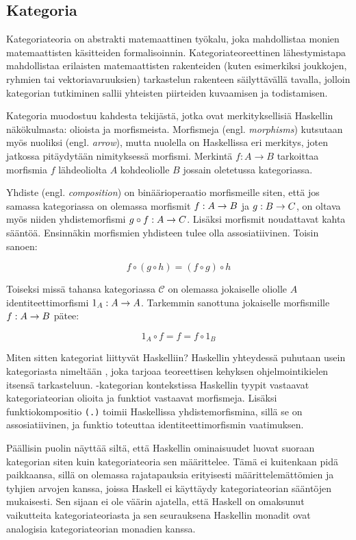 \documentclass[finnish]{tktltiki2}
\begin{document}
\subsection{Kategoria}

Kategoriateoria on abstrakti matemaattinen työkalu, joka mahdollistaa monien matemaattisten
käsitteiden formalisoinnin. Kategoriateoreettinen lähestymistapa mahdollistaa erilaisten
matemaattisten rakenteiden (kuten esimerkiksi joukkojen, ryhmien tai vektoriavaruuksien) tarkastelun
rakenteen säilyttävällä tavalla, jolloin kategorian tutkiminen sallii yhteisten piirteiden
kuvaamisen ja todistamisen.

Kategoria muodostuu kahdesta tekijästä, jotka ovat merkityksellisiä Haskellin näkökulmasta: olioista
ja morfismeista. Morfismeja (engl. \emph{morphisms}) kutsutaan myös nuoliksi (engl. \emph{arrow}),
mutta nuolella on Haskellissa eri merkitys, joten jatkossa pitäydytään nimityksessä morfismi.
Merkintä $f : A \rightarrow B$ tarkoittaa morfismia $f$ lähdeoliolta $A$ kohdeoliolle $B$ jossain
oletetussa kategoriassa.

Yhdiste (engl. \emph{composition}) on binäärioperaatio morfismeille siten, että jos samassa
kategoriassa on olemassa morfismit $f : A \rightarrow B$ ja $g : B \rightarrow C$, on oltava myös niiden
yhdistemorfismi $g \circ f : A \rightarrow C$. Lisäksi morfismit noudattavat kahta sääntöä. Ensinnäkin
morfismien yhdisteen tulee olla assosiatiivinen. Toisin sanoen:

$$f \circ (g \circ h) = (f \circ g) \circ h$$

Toiseksi missä tahansa kategoriassa $\mathcal{C}$ on olemassa jokaiselle oliolle $A$
identiteettimorfismi $1_A : A \rightarrow A$. Tarkemmin sanottuna jokaiselle morfismille $f : A \rightarrow B$
pätee:

$$ 1_A \circ f = f = f \circ 1_B $$


Miten sitten kategoriat liittyvät Haskelliin? Haskellin yhteydessä puhutaan usein kategoriasta
nimeltään , joka tarjoaa teoreettisen kehyksen ohjelmointikielen itsensä tarkasteluun.
-kategorian kontekstissa Haskellin tyypit vastaavat kategoriateorian olioita ja funktiot
vastaavat morfismeja. Lisäksi funktiokompositio \verb|(.)| toimii Haskellissa yhdistemorfismina,
sillä se on assosiatiivinen, ja funktio  toteuttaa identiteettimorfismin vaatimuksen.

Päällisin puolin näyttää siltä, että Haskellin ominaisuudet luovat suoraan kategorian siten kuin
kategoriateoria sen määrittelee. Tämä ei kuitenkaan pidä paikkaansa, sillä on olemassa rajatapauksia
erityisesti määrittelemättömien ja tyhjien arvojen kanssa, joissa Haskell ei käyttäydy
kategoriateorian sääntöjen mukaisesti. Sen sijaan ei ole väärin ajatella, että Haskell on omaksunut
vaikutteita kategoriateoriasta ja sen seurauksena Haskellin monadit ovat analogisia kategoriateorian
monadien kanssa.
\end{document}
